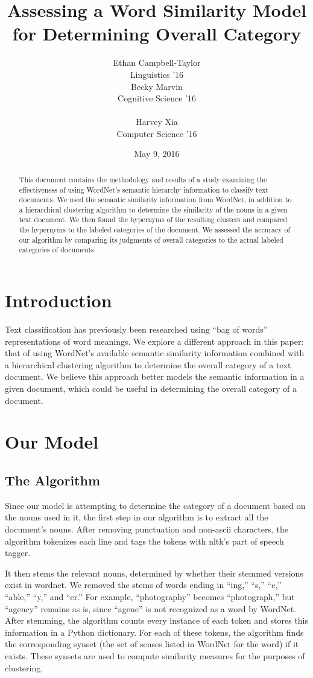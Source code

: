 \documentclass[11pt]{article}
\title{Assessing a Word Similarity Model for Determining Overall Category}
\author{Ethan Campbell-Taylor \\
Linguistics '16\\\And
  Becky Marvin \\
  Cognitive Science '16 \\
  \\\And
  Harvey Xia \\
  Computer Science '16 \\}
\date{May 9, 2016}
\begin{document}
\maketitle
\begin{abstract}
  This document contains the methodology and results of a study examining the effectiveness of using WordNet's semantic hierarchy information to classify text documents. We used the semantic similarity information from WordNet, in addition to a hierarchical clustering algorithm to determine the similarity of the nouns in a given text document. We then found the hypernyms of the resulting clusters and compared the hypernyms to the labeled categories of the document. We assessed the accuracy of our algorithm by comparing its judgments of overall categories to the actual labeled categories of documents.
\end{abstract}

\section{Introduction}

Text classification has previously been researched using ``bag of words'' representations of word meanings. We explore a different approach in this paper: that of using WordNet's available semantic similarity information combined with a hierarchical clustering algorithm to determine the overall category of a text document. We believe this approach better models the semantic information in a given document, which could be useful in determining the overall category of a document.


\section{Our Model}

\subsection{The Algorithm}

Since our model is attempting to determine the category of a document based on the nouns used in it, the first step in our algorithm is to extract all the document's nouns. After removing punctuation and non-ascii characters, the algorithm tokenizes each line and tags the tokens with nltk's part of speech tagger. 

It then stems the relevant nouns, determined by whether their stemmed versions exist in wordnet. We removed the stems of words ending in ``ing,'' ``s,'' ``e,'' ``able,'' ``y,'' and ``er.'' For example, ``photography'' becomes ``photograph,'' but ``agency'' remains as is, since ``agenc'' is not recognized as a word by WordNet. After stemming, the algorithm counts every instance of each token and stores this information in a Python dictionary. For each of these tokens, the algorithm finds the corresponding synset (the set of senses listed in WordNet for the word) if it exists. These synsets are used to compute similarity measures for the purposes of clustering.
\end{document}
